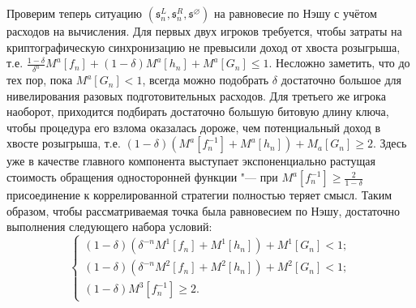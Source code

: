 Проверим теперь ситуацию $(\mathfrak{s}^L_n, \mathfrak{s}^R_n, \mathfrak{s}^{\varnothing})$ на равновесие по Нэшу с учётом расходов на вычисления. Для первых двух игроков требуется, чтобы затраты на криптографическую синхронизацию не превысили доход от хвоста розыгрыша, т.е. $\frac{1 - \delta}{\delta^n} M^a[f_n] + (1 - \delta) M^a[h_n] + M^a[G_n] \le 1$. Несложно заметить, что до тех пор, пока $M^a[G_n] < 1$, всегда можно подобрать $\delta$ достаточно большое для нивелирования разовых подготовительных расходов. Для третьего же игрока наоборот, приходится подбирать достаточно большую битовую длину ключа, чтобы процедура его взлома оказалась дороже, чем потенциальный доход в хвосте розыгрыша, т.е. $(1 - \delta) (M^a[f_n^{-1}] + M^a[h_n]) + M_a[G_n] \ge 2$. Здесь уже в качестве главного компонента выступает экспоненциально растущая стоимость обращения односторонней функции "--- при $M^a[f_n^{-1}] \ge \frac{2}{1 - \delta}$ присоединение к коррелированной стратегии полностью теряет смысл. Таким образом, чтобы рассматриваемая точка была равновесием по Нэшу, достаточно выполнения следующего набора условий:%
\begin{equation*}
	\begin{cases}
		(1 - \delta)(\delta^{-n} M^1[f_n] + M^1[h_n]) + M^1[G_n] < 1; \\
		(1 - \delta)(\delta^{-n} M^2[f_n] + M^2[h_n]) + M^2[G_n] < 1; \\
		(1 - \delta) M^3[f_n^{-1}] \ge 2.
	\end{cases}
\end{equation*}

